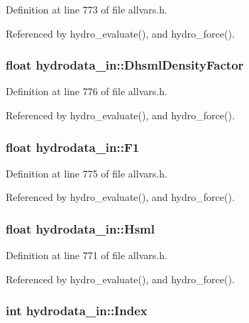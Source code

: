 Definition at line 773 of file allvars.h.



Referenced by hydro\_\-evaluate(), and hydro\_\-force().

\hypertarget{structhydrodata__in_ad2da50b0d4b51a53f9fb5cb4c41f20b8}{
\subsubsection[{DhsmlDensityFactor}]{\setlength{\rightskip}{0pt plus 5cm}float {\bf hydrodata\_\-in::DhsmlDensityFactor}}}
\label{structhydrodata__in_ad2da50b0d4b51a53f9fb5cb4c41f20b8}


Definition at line 776 of file allvars.h.



Referenced by hydro\_\-evaluate(), and hydro\_\-force().

\hypertarget{structhydrodata__in_a2b0cc9653b307eac998cec7175036b20}{
\subsubsection[{F1}]{\setlength{\rightskip}{0pt plus 5cm}float {\bf hydrodata\_\-in::F1}}}
\label{structhydrodata__in_a2b0cc9653b307eac998cec7175036b20}


Definition at line 775 of file allvars.h.



Referenced by hydro\_\-evaluate(), and hydro\_\-force().

\hypertarget{structhydrodata__in_ae24f9ceb40451913af1ab6e793772bdd}{
\subsubsection[{Hsml}]{\setlength{\rightskip}{0pt plus 5cm}float {\bf hydrodata\_\-in::Hsml}}}
\label{structhydrodata__in_ae24f9ceb40451913af1ab6e793772bdd}


Definition at line 771 of file allvars.h.



Referenced by hydro\_\-evaluate(), and hydro\_\-force().

\hypertarget{structhydrodata__in_a630be87b2fd46a0e22f57bde1a48e015}{
\subsubsection[{Index}]{\setlength{\rightskip}{0pt plus 5cm}int {\bf hydrodata\_\-in::Index}}}
\label{structhydrodata__in_a630be87b2fd46a0e22f57bde1a48e015}


